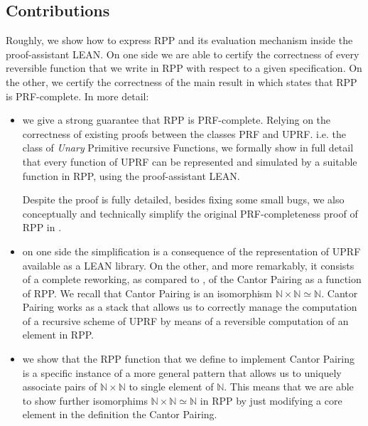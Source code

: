 \documentclass[runningheads]{llncs}
\newcommand{\RPP}{\textsf{RPP}\xspace}
\newcommand{\UPRF}{\textsf{UPRF}\xspace}
\newcommand{\PRF}{\textsf{PRF}\xspace}
\newcommand{\LEAN}{\textsf{LEAN}\xspace}
\begin{document}
\subsection{Contributions}
Roughly, we show how to express \RPP and its evaluation mechanism inside the proof-assistant \LEAN \cite{Lean3}. On one side we are able to certify the correctness of every reversible function that we write in \RPP with respect to a given specification. On the other, we certify the correctness of the main result in \cite{DBLP:journals/tcs/PaoliniPR20} which states that \RPP is \PRF-complete. In more detail:
\begin{itemize}
    \item we give a strong guarantee that \RPP is \PRF-complete.
    Relying on the correctness of existing proofs between the classes \PRF and \UPRF. i.e. the class of \emph{Unary} Primitive recursive Functions, we formally show in full detail that every function of \UPRF can be represented and simulated by a suitable function in \RPP, using the proof-assistant \LEAN.

    Despite the proof is fully detailed, besides fixing some small bugs, we also conceptually and technically simplify the original \PRF-completeness proof of \RPP in \cite{DBLP:journals/tcs/PaoliniPR20}.

    \item on one side the simplification is a consequence of the representation of \UPRF available as a \LEAN library. On the other, and more remarkably, it consists of a complete reworking, as compared to \cite{DBLP:journals/tcs/PaoliniPR20}, of the Cantor Pairing \cite{Cantor1878,DBLP:journals/corr/Szudzik17} as a function of \RPP. We recall that Cantor Pairing is an isomorphism $ \mathbb{N}\times\mathbb{N} \simeq \mathbb{N} $. Cantor Pairing works as a stack that allows us to correctly manage the computation of a recursive scheme of \UPRF by means of a reversible computation of an element in \RPP.

    \item we show that the \RPP function that we define to implement Cantor Pairing is a specific instance of a more general pattern that allows us to uniquely associate pairs of $ \mathbb{N}\times\mathbb{N}$ to single element of $ \mathbb{N}$. This means that we are able to show further isomorphims  $ \mathbb{N}\times\mathbb{N}\simeq \mathbb{N}$ in \RPP by just modifying a core element in the definition the Cantor Pairing.


\end{itemize}
\end{document}
